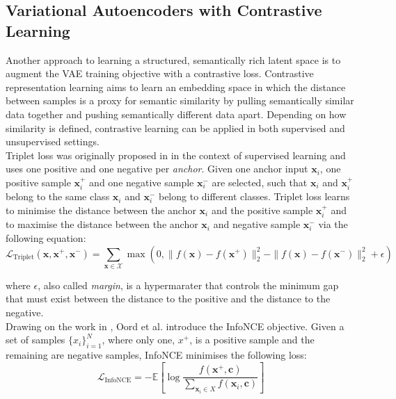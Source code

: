 \documentclass[Main.tex]{subfiles}
\begin{document}
\subsection{Variational Autoencoders with Contrastive Learning}
Another approach to learning a structured, semantically rich latent space is to augment the VAE training objective with a contrastive loss. Contrastive representation learning aims to learn an embedding space in which the distance between samples is a proxy for semantic similarity by pulling semantically similar data together and pushing semantically different data apart. Depending on how similarity is defined, contrastive learning can be applied in both supervised and unsupervised settings.\\

Triplet loss was originally proposed in \cite{schroff_facenet_2015} in the context of supervised learning and uses one positive and one negative per \textit{anchor}. Given one anchor input $\textbf{x}_{i}$, one positive sample $\textbf{x}_{i}^{+}$ and one negative sample $\textbf{x}_{i}^{-}$ are selected, such that $\textbf{x}_i$ and $\textbf{x}_{i}^{+}$ belong to the same class $\textbf{x}_{i}$ and $\textbf{x}_{i}^{-}$ belong to different classes. Triplet loss learns to minimise the distance between the anchor $\textbf{x}_{i}$ and the positive sample $\textbf{x}_{i}^{+}$ and to maximise the distance between the anchor $\textbf{x}_{i}$ and negative sample $\textbf{x}_{i}^{-}$ via the following equation:
\begin{equation}
\mathcal{L}_{\text{Triplet}}(\mathbf{x}, \mathbf{x}^{+}, \mathbf{x}^{-}) = \sum_{\mathbf{x} \in \mathcal{X}} \max\left(0, \|f(\mathbf{x}) - f(\mathbf{x}^{+})\|_{2}^{2} - \|f(\mathbf{x}) - f(\mathbf{x}^{-})\|_{2}^{2} + \epsilon\right)
\end{equation}
 
where $\epsilon$, also called \textit{margin}, is a hypermarater that controls the minimum gap that must exist between the distance to the positive and the distance to the negative.\\

Drawing on the work in \cite{gutmann_noise-contrastive_nodate}, Oord et al. \cite{oord_representation_2018} introduce the InfoNCE objective. Given a set of samples $\{x_i\}_{i=1}^N$, where only one, $x^+$, is a positive sample and the remaining are negative samples, InfoNCE minimises the following loss:
\begin{equation}
    \mathcal{L}_{\text{InfoNCE}} = -\mathbb{E}\left[\log \frac{f(\mathbf{x}^{+}, \mathbf{c})}{\sum_{\mathbf{x}_i \in X} f(\mathbf{x}_i, \mathbf{c})}\right]
\end{equation}
\end{document}
